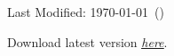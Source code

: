 
{
\color{red}
\begin{center}

    Last Modified: \today \ (\currenttime)

    Download latest version \href{{https://github.com/leospecks/Thesis-Project/tree/main/1_latex/build/main.pdf}}{\textit{\underline{here}}}. 
\end{center}
}